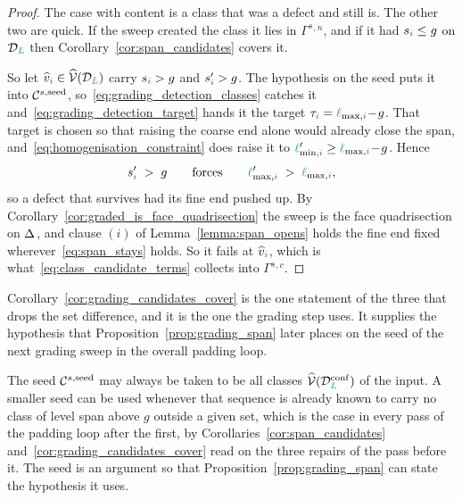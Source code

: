\documentclass[a4paper, 12pt]{article}
\makeatletter
\newcommand{\collectC}{\Gamma^{s}}                               %
\DeclareRobustCommand{\candC}[1][]{\mathcal{C}^{s\ifx\@empty#1\@empty\else,#1\fi}}
\newcommand{\lminIdx}[1]{\l_{\min,#1}}
\newcommand{\lmaxIdx}[1]{\l_{\max,#1}}
\newcommand{\levelSpan}[1]{s_{#1}}
\newcommand{\targetlevel}{\tau}                                 %
\newcommand{\green}{\color{ForestGreen}}
\newcommand{\brickred}{\color{BrickRed}}
\newcommand{\V}{\mathcal{V}}
\DeclareRobustCommand{\simplexsubsetTwo}[2][]{\Delta\ifx\@empty#1\@empty\else^{#1}\fi_{#2}}
\newcommand{\vertexClass}[1]{\widehat{v}_{#1}}
\newcommand{\vertexClasses}{\widehat{\V}}
\newcommand{\coarseIdxone}{{\brickred i}}
\renewcommand{\l}{{\green\ell}}
\renewcommand{\L}{{\green L}}
\theoremstyle{definition}
\theoremstyle{plain}
\numberwithin{equation}{section}
\newcommand{\tobecut}[1]{{\color{red} #1}}     %
\DeclareRobustCommand{\domseq}[1][]{\mathcal{D}\ifx\@empty#1\@empty\else_{#1}\fi}
\makeatother
\begin{document}
\begin{proof}
    The case with content is a class that was a defect and still is. The other two are quick. If the sweep created the class it lies in $\collectC{}^{,n}$, and if it had $\levelSpan{\coarseIdxone} \leq g$ on $\domseq[\L]$ then Corollary~\ref{cor:span_candidates} covers it.

    So let $\vertexClass{\coarseIdxone} \in \vertexClasses(\domseq[\L])$ carry $\levelSpan{\coarseIdxone} > g$ and $\levelSpan{\coarseIdxone}' > g$. The hypothesis on the seed puts it into $\candC[\mathrm{seed}]$, so~\eqref{eq:grading_detection_classes} catches it and~\eqref{eq:grading_detection_target} hands it the target $\targetlevel_\coarseIdxone = \lmaxIdx{\coarseIdxone} \! - \! g$. That target is chosen so that raising the coarse end alone would already close the span, and~\eqref{eq:homogenisation_constraint} does raise it to $\lminIdx{\coarseIdxone}' \geq \lmaxIdx{\coarseIdxone} \! - \! g$. Hence
    \begin{equation*}
        \levelSpan{\coarseIdxone}' \; > \; g \qquad \text{forces} \qquad \lmaxIdx{\coarseIdxone}' \; > \; \lmaxIdx{\coarseIdxone} ,
    \end{equation*}
    so a defect that survives had its fine end pushed up. By Corollary~\ref{cor:graded_is_face_quadrisection} the sweep is the face quadrisection on $\simplexsubsetTwo{}$, and clause $(i)$ of Lemma~\ref{lemma:span_opens} holds the fine end fixed wherever~\eqref{eq:span_stays} holds. So it fails at $\vertexClass{\coarseIdxone}$, which is what~\eqref{eq:class_candidate_terms} collects into $\collectC{}^{,c}$.
\end{proof}

Corollary~\ref{cor:grading_candidates_cover} is the one statement of the three that drops the set difference, and it is the one the grading step uses. It supplies the hypothesis that Proposition~\ref{prop:grading_span} later places on the seed of the next grading sweep in the overall padding loop.

\tobecut{The seed $\candC[\mathrm{seed}]$ may always be taken to be all classes $\vertexClasses(\domseq[\L]^{\mathrm{conf}})$ of the input. A smaller seed can be used whenever that sequence is already known to carry no class of level span above $g$ outside a given set, which is the case in every pass of the padding loop after the first, by Corollaries~\ref{cor:span_candidates} and~\ref{cor:grading_candidates_cover} read on the three repairs of the pass before it.} The seed is an argument so that Proposition~\ref{prop:grading_span} can state the hypothesis it uses.
\end{document}
